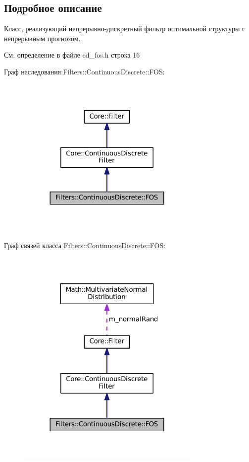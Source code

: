 \subsection{Подробное описание}
Класс, реализующий непрерывно-\/дискретный фильтр оптимальной структуры с непрерывным прогнозом. 

См. определение в файле cd\+\_\+fos.\+h строка 16



Граф наследования\+:Filters\+:\+:Continuous\+Discrete\+:\+:F\+OS\+:
\nopagebreak
\begin{figure}[H]
\begin{center}
\leavevmode
\includegraphics[width=252pt]{class_filters_1_1_continuous_discrete_1_1_f_o_s__inherit__graph}
\end{center}
\end{figure}


Граф связей класса Filters\+:\+:Continuous\+Discrete\+:\+:F\+OS\+:
\nopagebreak
\begin{figure}[H]
\begin{center}
\leavevmode
\includegraphics[width=252pt]{class_filters_1_1_continuous_discrete_1_1_f_o_s__coll__graph}
\end{center}
\end{figure}



